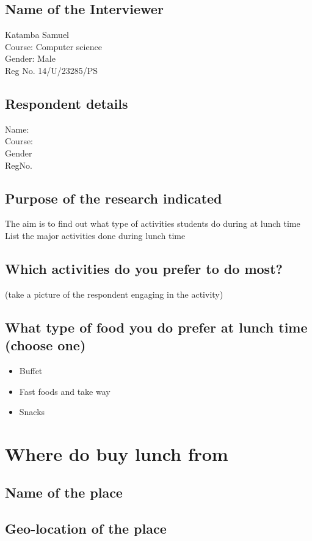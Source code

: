 \documentclass[12pt,a4paper]{article}
\begin{document}
\subsection {Name of the Interviewer} 
Katamba Samuel\\
Course: Computer science\\
Gender: Male\\
Reg No. 14/U/23285/PS\\

\subsection{Respondent details}
Name:\\
Course:\\
Gender\\
RegNo.\\

\subsection{Purpose of the research indicated}
The aim is to find out what type of activities students do during at lunch time
List the major activities done during lunch time

\subsection{Which activities do you prefer to do most?}
(take a picture of the respondent engaging in the activity)

\subsection{What type of food you do prefer at lunch time (choose one)}
\begin{itemize}
\item Buffet
\item Fast foods and take way
\item Snacks
\end{itemize}

\section{Where do buy lunch from}
\subsection{Name of the place}
\subsection{Geo-location of the place}
\end{document}
